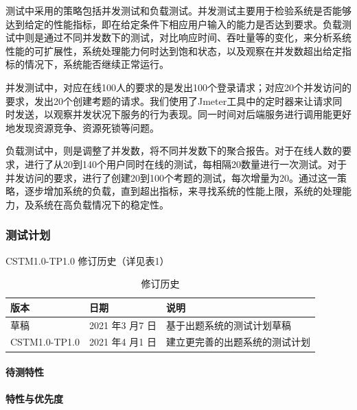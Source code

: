 \documentclass[hyperref, a4paper]{ctexart}
\let\oldparagraph\paragraph
\renewcommand{\paragraph}[1]{\oldparagraph{#1}\mbox{}}
\begin{document}
测试中采用的策略包括并发测试和负载测试。并发测试主要用于检验系统是否能够达到给定的性能指标，即在给定条件下相应用户输入的能力是否达到要求。负载测试中则是通过不同并发数下的测试，对比响应时间、吞吐量等的变化，来分析系统性能的可扩展性，系统处理能力何时达到饱和状态，以及观察在并发数超出给定指标的情况下，系统能否继续正常运行。

并发测试中，对应在线100人的要求的是发出100个登录请求；对应20个并发访问的要求，发出20个创建考题的请求。我们使用了Jmeter工具中的定时器来让请求同时发送，以观察并发状况下服务的行为表现。同一时间对后端服务进行调用能更好地发现资源竞争、资源死锁等问题。

负载测试中，则是调整了并发数，将不同并发数下的聚合报告。对于在线人数的要求，进行了从20到140个用户同时在线的测试，每相隔20数量进行一次测试。对于并发访问的要求，进行了创建20到100个考题的测试，每次增量为20。通过这一策略，逐步增加系统的负载，直到超出指标，来寻找系统的性能上限，系统的处理能力，及系统在高负载情况下的稳定性。

\hypertarget{ux6d4bux8bd5ux8ba1ux5212}{%
\subsubsection{测试计划}\label{ux6d4bux8bd5ux8ba1ux5212}}

CSTM1.0-TP1.0 修订历史（详见表1）

\begin{table}[h]
\centering
\caption{修订历史}
\begin{tabular}{|p{2cm}|p{3.3cm}|p{5cm}|}
\hline
版本 & 日期 & 说明\\
\hline
草稿 & 2021 年3 月7 日 & 基于出题系统的测试计划草稿\\
\hline
CSTM1.0-TP1.0 & 2021 年4 月1 日 & 建立更完善的出题系统的测试计划\\
\hline
\end{tabular}
\end{table}

\hypertarget{ux5f85ux6d4bux7279ux6027}{%
\paragraph{待测特性}\label{ux5f85ux6d4bux7279ux6027}}

\hypertarget{ux7279ux6027ux4e0eux4f18ux5148ux5ea6}{%
\paragraph{特性与优先度}\label{ux7279ux6027ux4e0eux4f18ux5148ux5ea6}}
\end{document}
